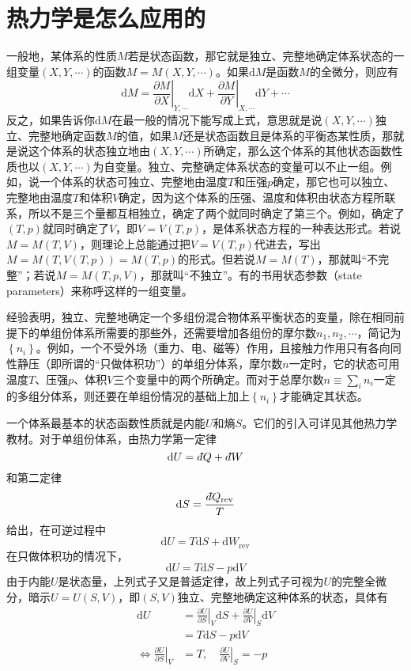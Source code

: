 \documentclass[main.tex]{subfiles}
\begin{document}
\section{热力学是怎么应用的}
一般地，某体系的性质$M$若是状态函数，那它就是独立、完整地确定体系状态的一组变量$\left(X,Y,\cdots\right)$的函数$M=M\left(X,Y,\cdots\right)$。如果$\mathrm{d}M$是函数$M$的全微分，则应有
\[\mathrm{d}M=\left.\frac{\partial M}{\partial X}\right|_{Y,\cdots}\mathrm{d}X+\left.\frac{\partial M}{\partial Y}\right|_{X,\cdots}\mathrm{d}Y+\cdots\]
反之，如果告诉你$\mathrm{d}M$在最一般的情况下能写成上式，意思就是说$\left(X,Y,\cdots\right)$独立、完整地确定函数$M$的值，如果$M$还是状态函数且是体系的平衡态某性质，那就是说这个体系的状态独立地由$\left(X,Y,\cdots\right)$所确定，那么这个体系的其他状态函数性质也以$\left(X,Y,\cdots\right)$为自变量。独立、完整确定体系状态的变量可以不止一组。例如，说一个体系的状态可独立、完整地由温度$T$和压强$p$确定，那它也可以独立、完整地由温度$T$和体积$V$确定，因为这个体系的压强、温度和体积由状态方程所联系，所以不是三个量都互相独立，确定了两个就同时确定了第三个。例如，确定了$\left(T,p\right)$就同时确定了$V$，即$V=V\left(T,p\right)$，是体系状态方程的一种表达形式。若说$M=M\left(T,V\right)$，则理论上总能通过把$V=V\left(T,p\right)$代进去，写出$M=M\left(T,V\left(T,p\right)\right)=M\left(T,p\right)$的形式。但若说$M=M\left(T\right)$，那就叫“不完整”；若说$M=M\left(T,p,V\right)$，那就叫“不独立”。有的书用状态参数（state parameters）来称呼这样的一组变量。

经验表明，独立、完整地确定一个多组份混合物体系平衡状态的变量，除在相同前提下的单组份体系所需要的那些外，还需要增加各组份的摩尔数$n_1,n_2,\cdots$，简记为$\left\{n_i\right\}$。例如，一个不受外场（重力、电、磁等）作用，且接触力作用只有各向同性静压（即所谓的“只做体积功”）的单组分体系，摩尔数$n$一定时，它的状态可用温度$T$、压强$p$、体积$V$三个变量中的两个所确定。而对于总摩尔数$n\equiv\sum_in_i$一定的多组分体系，则还要在单组份情况的基础上加上$\left\{n_i\right\}$才能确定其状态。

一个体系最基本的状态函数性质就是内能$U$和熵$S$。它们的引入可详见其他热力学教材。对于单组份体系，由热力学第一定律
\[\mathrm{d}U=d\hspace*{-0.08em}\bar{}\hspace*{0.1em} Q+d\hspace*{-0.08em}\bar{}\hspace*{0.1em} W\]
和第二定律
\[\mathrm{d} S=\frac{d\hspace*{-0.08em}\bar{}\hspace*{0.1em} Q_\text{rev}}{T}\]
给出，在可逆过程中
\[\mathrm{d}U=T\mathrm{d}S+\mathrm{d}W_\text{rev}\]
在只做体积功的情况下，
\[\mathrm{d}U=T\mathrm{d}S-p\mathrm{d}V\]
由于内能$U$是状态量，上列式子又是普适定律，故上列式子可视为$U$的完整全微分，暗示$U=U\left(S,V\right)$，即$\left(S,V\right)$独立、完整地确定这种体系的状态，具体有
\begin{align*}
    \mathrm{d}U                                                   & =\left.\frac{\partial U}{\partial S}\right|_V\mathrm{d}S+\left.\frac{\partial U}{\partial V}\right|_{S}\mathrm{d}V \\
                                                                  & =T\mathrm{d}S-p\mathrm{d}V                                                                                         \\
    \Leftrightarrow\left.\frac{\partial U}{\partial S}\right|_{V} & =T,\quad\left.\frac{\partial U}{\partial V}\right|_{S}=-p
\end{align*}
\end{document}
